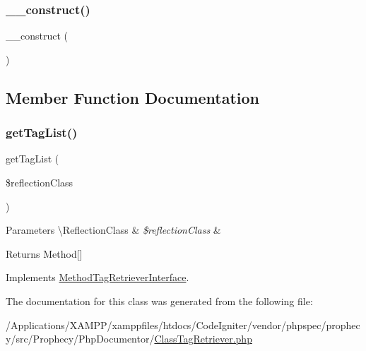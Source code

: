 \subsubsection{\texorpdfstring{\+\_\+\+\_\+construct()}{\_\_construct()}}
{\footnotesize\ttfamily \+\_\+\+\_\+construct (\begin{DoxyParamCaption}{ }\end{DoxyParamCaption})}



\subsection{Member Function Documentation}
\mbox{\label{class_prophecy_1_1_php_documentor_1_1_class_tag_retriever_a2eb68ce00dcc84a156b9a2b7844a5e6f}} 
\subsubsection{\texorpdfstring{get\+Tag\+List()}{getTagList()}}
{\footnotesize\ttfamily get\+Tag\+List (\begin{DoxyParamCaption}\item[{\textbackslash{}Reflection\+Class}]{\$reflection\+Class }\end{DoxyParamCaption})}


\begin{DoxyParams}[1]{Parameters}
\textbackslash{}\+Reflection\+Class & {\em \$reflection\+Class} & \\
\hline
\end{DoxyParams}
\begin{DoxyReturn}{Returns}
Method\mbox{[}\mbox{]} 
\end{DoxyReturn}


Implements \mbox{\hyperlink{interface_prophecy_1_1_php_documentor_1_1_method_tag_retriever_interface_a2eb68ce00dcc84a156b9a2b7844a5e6f}{Method\+Tag\+Retriever\+Interface}}.



The documentation for this class was generated from the following file\+:\begin{DoxyCompactItemize}
\item 
/\+Applications/\+X\+A\+M\+P\+P/xamppfiles/htdocs/\+Code\+Igniter/vendor/phpspec/prophecy/src/\+Prophecy/\+Php\+Documentor/\mbox{\hyperlink{_class_tag_retriever_8php}{Class\+Tag\+Retriever.\+php}}\end{DoxyCompactItemize}
